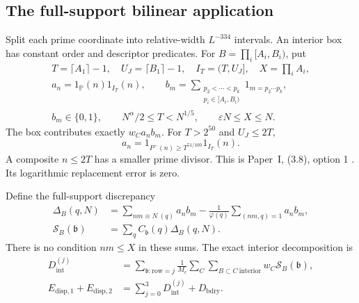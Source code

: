 \subsection{The full-support bilinear application}

Split each prime coordinate into relative-width $L^{-334}$ intervals.
An interior box has constant order and descriptor predicates.
For $B=\prod_i[A_i,B_i)$, put
\begin{equation}\label{eq:l3-direct-prime}
\begin{gathered}
 T=\lceil A_1\rceil-1,\quad U_J=\lceil B_1\rceil-1,\quad
 I_T=(T,U_J],\quad X=\prod_iA_i,\\
 a_n=1_{\mathbb P}(n)1_{I_T}(n),\qquad
 b_m=\sum_{\substack{p_2<\cdots<p_k\\p_i\in[A_i,B_i)}}1_{m=p_2\cdots p_k},\\
 b_m\in\{0,1\},\qquad
 N^\alpha/2\le T<N^{1/5},\qquad \varepsilon N\le X\le N.
\end{gathered}
\end{equation}
The box contributes exactly $w_Ca_nb_m$.
For $T>2^{50}$ and $U_J\le2T$,
\begin{equation}\label{eq:l3-prime-option}
 a_n=1_{P^-(n)\ge T^{51/100}}1_{I_T}(n).
\end{equation}
A composite $n\le2T$ has a smaller prime divisor.
This is Paper~I, (3.8), option 1
\cite[(3.8)--(3.9)]{PaperI}.
Its logarithmic replacement error is zero.

Define the full-support discrepancy
\begin{equation}\label{eq:l3-box-discrepancy}
\begin{aligned}
 \Delta_B(q,N)&=\sum_{nm\equiv N\ (q)}a_nb_m
           -\frac1{\varphi(q)}\sum_{(nm,q)=1}a_nb_m,\\
 \mathcal S_B(\mathfrak b)&=\sum_qC_{\mathfrak b}(q)\Delta_B(q,N).
\end{aligned}
\end{equation}
There is no condition $nm\le X$ in these sums.
The exact interior decomposition is
\begin{equation}\label{eq:l3-interior-split}
\begin{aligned}
 D_{\mathrm{int}}^{(j)}
 &=\sum_{\mathfrak b:\mathrm{row}=j}\frac1{M_c}
           \sum_C\sum_{B\subset C\ \mathrm{interior}}w_C\mathcal S_B(\mathfrak b),\\
 E_{\mathrm{disp},1}+E_{\mathrm{disp},2}
 &=\sum_{j=0}^3D_{\mathrm{int}}^{(j)}+D_{\mathrm{bdry}}.
\end{aligned}
\end{equation}

